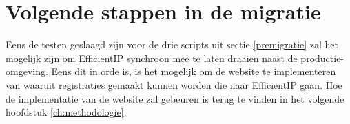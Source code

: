 \section{Volgende stappen in de migratie}
Eens de testen geslaagd zijn voor de drie scripts uit sectie \ref{premigratie} zal het mogelijk zijn om EfficientIP synchroon mee te laten draaien naast de productie-omgeving. Eens dit in orde is, is het mogelijk om de website te implementeren van waaruit registraties gemaakt kunnen worden die naar EfficientIP gaan. Hoe de implementatie van de website zal gebeuren is terug te vinden in het volgende hoofdstuk \ref{ch:methodologie}.


